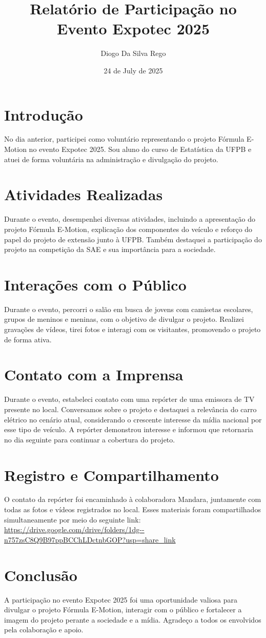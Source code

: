 \documentclass[12pt]{article}
\title{Relatório de Participação no Evento Expotec 2025}
\author{Diogo Da Silva Rego}
\date{24 de July de 2025}
\begin{document}
\maketitle

\section*{Introdução}
No dia anterior, participei como voluntário representando o projeto Fórmula E-Motion no evento Expotec 2025. Sou aluno do curso de Estatística da UFPB e atuei de forma voluntária na administração e divulgação do projeto.

\section*{Atividades Realizadas}
Durante o evento, desempenhei diversas atividades, incluindo a apresentação do projeto Fórmula E-Motion, explicação dos componentes do veículo e reforço do papel do projeto de extensão junto à UFPB. Também destaquei a participação do projeto na competição da SAE e sua importância para a sociedade.

\section*{Interações com o Público}
Durante o evento, percorri o salão em busca de jovens com camisetas escolares, grupos de meninos e meninas, com o objetivo de divulgar o projeto. Realizei gravações de vídeos, tirei fotos e interagi com os visitantes, promovendo o projeto de forma ativa.

\section*{Contato com a Imprensa}
Durante o evento, estabeleci contato com uma repórter de uma emissora de TV presente no local. Conversamos sobre o projeto e destaquei a relevância do carro elétrico no cenário atual, considerando o crescente interesse da mídia nacional por esse tipo de veículo. A repórter demonstrou interesse e informou que retornaria no dia seguinte para continuar a cobertura do projeto.

\section*{Registro e Compartilhamento}
O contato da repórter foi encaminhado à colaboradora Mandara, juntamente com todas as fotos e vídeos registrados no local. Esses materiais foram compartilhados simultaneamente por meio do seguinte link: \\
\url{https://drive.google.com/drive/folders/1dg--n757zsC8Q9B97ppBCChLDctnbGOP?usp=share_link}

\section*{Conclusão}
A participação no evento Expotec 2025 foi uma oportunidade valiosa para divulgar o projeto Fórmula E-Motion, interagir com o público e fortalecer a imagem do projeto perante a sociedade e a mídia. Agradeço a todos os envolvidos pela colaboração e apoio.
\end{document}
